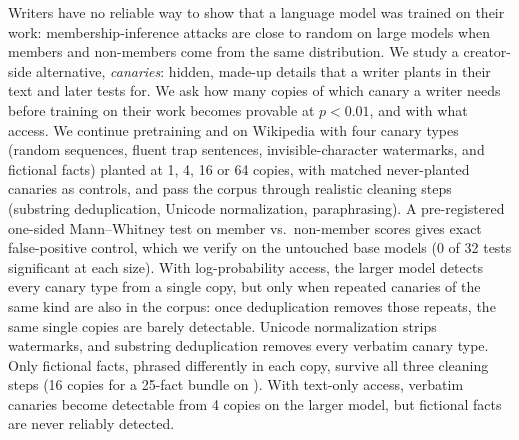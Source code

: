 Writers have no reliable way to show that a language model was trained on their work: membership-inference
attacks are close to random on large models when members and non-members come from the same distribution. We
study a creator-side alternative, \emph{canaries}: hidden, made-up details that a writer plants in their text and
later tests for. We ask how many copies of which canary a writer needs before training on their work becomes
provable at $p<0.01$, and with what access. We continue pretraining  and  on Wikipedia with four canary
types (random sequences, fluent trap sentences, invisible-character watermarks, and fictional facts) planted at
1, 4, 16 or 64 copies, with matched never-planted canaries as controls, and pass the corpus through realistic
cleaning steps (substring deduplication, Unicode normalization, paraphrasing). A pre-registered one-sided
Mann--Whitney test on member vs.\ non-member scores gives exact false-positive control, which we verify on the
untouched base models (0 of 32 tests significant at each size). With log-probability access, the larger model
detects every canary type from a single copy, but only when repeated canaries of the same kind are also in the
corpus: once deduplication removes those repeats, the same single copies are barely detectable. Unicode
normalization strips watermarks, and substring deduplication removes every verbatim canary type. Only fictional
facts, phrased differently in each copy, survive all three cleaning steps (16 copies for a 25-fact bundle on
). With text-only access, verbatim canaries become detectable from 4 copies on the larger model, but
fictional facts are never reliably detected.
